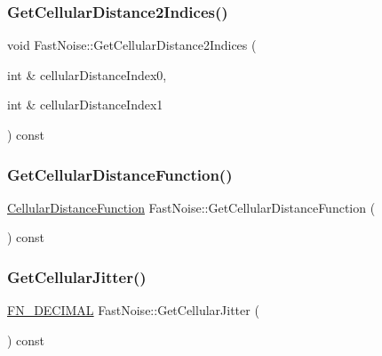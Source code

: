 \subsubsection{\texorpdfstring{Get\+Cellular\+Distance2\+Indices()}{GetCellularDistance2Indices()}}
{\footnotesize\ttfamily void Fast\+Noise\+::\+Get\+Cellular\+Distance2\+Indices (\begin{DoxyParamCaption}\item[{int \&}]{cellular\+Distance\+Index0,  }\item[{int \&}]{cellular\+Distance\+Index1 }\end{DoxyParamCaption}) const}

\mbox{\label{class_fast_noise_a16af57f7010f7770d3b866619d89599c}} 
\subsubsection{\texorpdfstring{Get\+Cellular\+Distance\+Function()}{GetCellularDistanceFunction()}}
{\footnotesize\ttfamily \mbox{\hyperlink{class_fast_noise_a457e58d0da6dbe486deb5a21a3db52bf}{Cellular\+Distance\+Function}} Fast\+Noise\+::\+Get\+Cellular\+Distance\+Function (\begin{DoxyParamCaption}{ }\end{DoxyParamCaption}) const\hspace{0.3cm}{\ttfamily [inline]}}

\mbox{\label{class_fast_noise_a5b8e99dc20ff89a137b9b90611463ff3}} 
\subsubsection{\texorpdfstring{Get\+Cellular\+Jitter()}{GetCellularJitter()}}
{\footnotesize\ttfamily \mbox{\hyperlink{_fast_noise_8h_a75a9ef6d2541c4921815b885bfd449c3}{F\+N\+\_\+\+D\+E\+C\+I\+M\+AL}} Fast\+Noise\+::\+Get\+Cellular\+Jitter (\begin{DoxyParamCaption}{ }\end{DoxyParamCaption}) const\hspace{0.3cm}{\ttfamily [inline]}}

